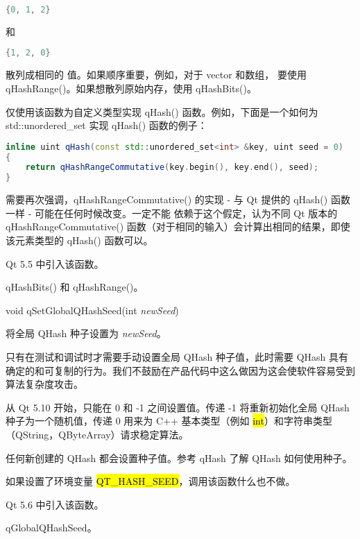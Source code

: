 \begin{lstlisting}[language=C++]
{0, 1, 2}
\end{lstlisting}

和

\begin{lstlisting}[language=C++]
{1, 2, 0}
\end{lstlisting}

散列成相同的 值。如果顺序重要，例如，对于 vector 和数组， 要使用 qHashRange()。如果想散列原始内存，使用 qHashBits()。

仅使用该函数为自定义类型实现 qHash() 函数。例如，下面是一个如何为
std::unordered\_set 实现 qHash() 函数的例子：

\begin{lstlisting}[language=C++]
inline uint qHash(const std::unordered_set<int> &key, uint seed = 0)
{
    return qHashRangeCommutative(key.begin(), key.end(), seed);
}
\end{lstlisting}

需要再次强调，qHashRangeCommutative() 的实现 - 与 Qt 提供的 qHash() 函数一样 - 可能在任何时候改变。一定不能 依赖于这个假定，认为不同 Qt 版本的 qHashRangeCommutative() 函数（对于相同的输入）会计算出相同的结果，即使该元素类型的 qHash() 函数可以。

Qt 5.5 中引入该函数。

\begin{notice}[另请参阅]
qHashBits() 和 qHashRange()。
\end{notice}

void qSetGlobalQHashSeed(int \emph{newSeed})

将全局 QHash 种子设置为 \emph{newSeed}。

只有在测试和调试时才需要手动设置全局 QHash 种子值，此时需要 QHash 具有确定的和可复制的行为。我们不鼓励在产品代码中这么做因为这会使软件容易受到 算法复杂度攻击。

从 Qt 5.10 开始，只能在 0 和 -1 之间设置值。传递 -1 将重新初始化全局 QHash 种子为一个随机值，传递 0 用来为 C++ 基本类型（例如 \hl{int}）和字符串类型（QString，QByteArray）请求稳定算法。

任何新创建的 QHash 都会设置种子值。参考 qHash 了解 QHash 如何使用种子。

如果设置了环境变量 \hl{QT\_HASH\_SEED}，调用该函数什么也不做。

Qt 5.6 中引入该函数。

\begin{notice}[另请参阅]
qGlobalQHashSeed。
\end{notice}


